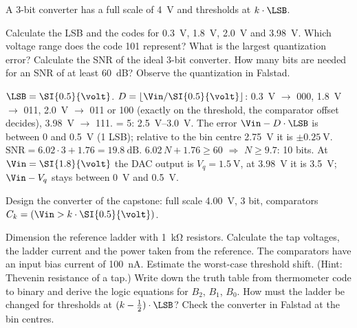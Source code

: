 A 3-bit converter has a full scale of \SI{4}{\volt} and thresholds at
$k\cdot\LSB$.
\begin{talist}
\ta Calculate the LSB and the codes for \SI{0.3}{\volt}, \SI{1.8}{\volt}, \SI{2.0}{\volt} and \SI{3.98}{\volt}.
\ta Which voltage range does the code 101 represent? What is the largest quantization error?
\ta Calculate the SNR of the ideal 3-bit converter. How many bits are needed for an SNR of at least \SI{60}{\dB}?
\ta Observe the quantization in Falstad.
\end{talist}

\begin{solution}
\begin{talist}
\ta $\LSB = \SI{0.5}{\volt}$. $D = \lfloor\Vin/\SI{0.5}{\volt}\rfloor$: \SI{0.3}{\volt} $\to$ 000,
	\SI{1.8}{\volt} $\to$ 011, \SI{2.0}{\volt} $\to$ 011 or 100 (exactly on the threshold, the
	comparator offset decides), \SI{3.98}{\volt} $\to$ 111.
 = 5: \SIrange{2.5}{3.0}{\volt}. The error $\Vin - D\cdot\LSB$ is between 0 and
	\SI{0.5}{\volt} (1 LSB); relative to the bin centre \SI{2.75}{\volt} it is $\pm\SI{0.25}{\volt}$.
\ta $\mathrm{SNR} = 6.02\cdot 3 + 1.76 = \SI{19.8}{\dB}$.
	$6.02\,N + 1.76 \geq 60$ $\Rightarrow$ $N \geq 9.7$: 10 bits.
\ta {}\newline At $\Vin = \SI{1.8}{\volt}$ the DAC output is $V_q = \SI{1.5}{\volt}$,
	at \SI{3.98}{\volt} it is \SI{3.5}{\volt}; $\Vin - V_q$ stays between \SI{0}{\volt} and \SI{0.5}{\volt}.
\end{talist}
\end{solution}

Design the converter of the capstone: full scale \SI{4.00}{\volt}, 3 bit,
comparators $C_k = (\Vin > k\cdot\SI{0.5}{\volt})$.
\begin{talist}
\ta Dimension the reference ladder with \SI{1}{\kilo\ohm} resistors. Calculate the tap voltages,
	the ladder current and the power taken from the reference.
\ta The comparators have an input bias current of \SI{100}{\nano\ampere}. Estimate the
	worst-case threshold shift. (Hint: Thevenin resistance of a tap.)
\ta Write down the truth table from thermometer code to binary and derive the logic
	equations for $B_2$, $B_1$, $B_0$.
\ta How must the ladder be changed for thresholds at $(k-\frac12)\cdot\LSB$?
\ta Check the converter in Falstad at the bin centres.
\end{talist}


